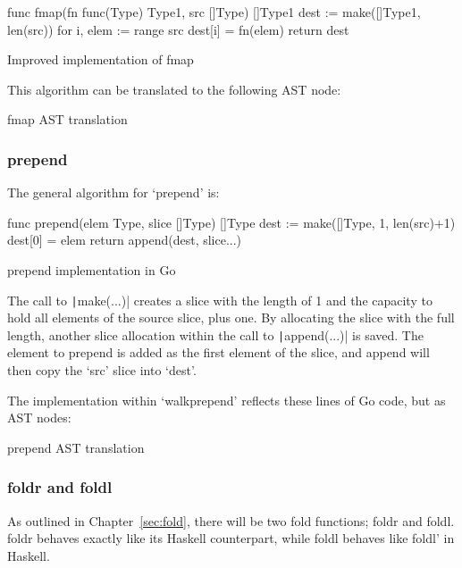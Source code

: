 \begin{listing}
	\begin{gocode}
func fmap(fn func(Type) Type1, src []Type) []Type1 {
	dest := make([]Type1, len(src))
	for i, elem := range src {
		dest[i] = fn(elem)
	}
	return dest
}
	\end{gocode}
	\caption{Improved implementation of fmap}\label{code:fmap-go-improved}
\end{listing}
This algorithm can be translated to the following AST node:

\begin{code}
	\caption{fmap AST translation\autocite{fmap-walk-implementation}}
\end{code}
\subsubsection{prepend}

The general algorithm for `prepend' is:
\begin{listing}
	\begin{gocode}
func prepend(elem Type, slice []Type) []Type {
	dest := make([]Type, 1, len(src)+1)
	dest[0] = elem
	return append(dest, slice...)
}
	\end{gocode}
	\caption{prepend implementation in Go}
\end{listing}
The call to \texttt|make(...)| creates a slice with the length of 1 and the capacity
to hold all elements of the source slice, plus one. By allocating the slice with the full
length, another slice allocation within the call to \texttt|append(...)| is saved.
The element to prepend is added as the first element of the slice, and append will then
copy the `src' slice into `dest'.

The implementation within `walkprepend' reflects these lines of Go code, but
as AST nodes:

\begin{code}
	\caption{prepend AST translation\autocite{prepend-walk-implementation}}
\end{code}
\subsubsection{foldr and foldl}

As outlined in Chapter~\ref{sec:fold}, there will be two fold functions;
foldr and foldl. foldr behaves exactly like its Haskell counterpart,
while foldl behaves like foldl' in Haskell.

